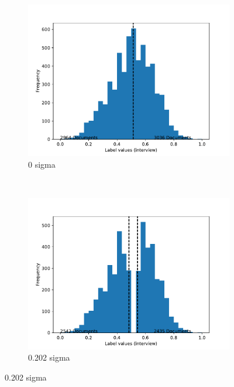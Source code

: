 \documentclass[12pt,a4paper]{report}
\begin{document}
\begin{figure}
    \centering
    \begin{subfigure}[b]{0.32\textwidth}
        \includegraphics[width=\textwidth]{imgs/training_histogram/0000000_training_histogram.pdf}
        \caption{0 sigma}
        \label{fig:0 sigma}
    \end{subfigure}
    ~ %
    \begin{subfigure}[b]{0.32\textwidth}
        \includegraphics[width=\textwidth]{imgs/training_histogram/0201942_training_histogram.pdf}
        \caption{0.202 sigma}
        \label{fig:0.202 sigma}

\end{subfigure}
\end{figure}
\end{document}
